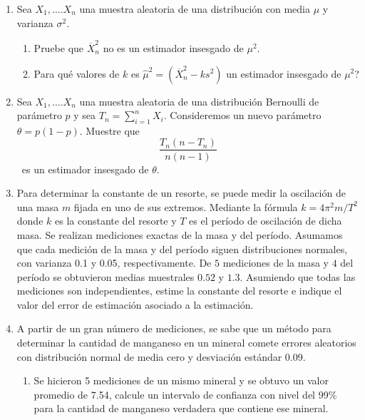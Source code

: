 \documentclass[11pt,a4paper,twoside]{article}%
\begin{document}
\begin{enumerate}
\item Sea $X_{1},\ldots.X_{n}$ una muestra aleatoria de una distribuci\'{o}n
con media $\mu$ y varianza $\sigma^{2}$.

\begin{enumerate}
\item Pruebe que $\overline{X}_{n}^{2}$ no es un estimador insesgado de
$\mu^{2}$.

\item \textquestiondown Para qu\'{e} valores de $k$ es $\widehat{\mu}%
^{2}=\left(  \overline{X}_{n}^{2}-ks^{2}\right)  $ un estimador insesgado de
$\mu^{2}$?
\end{enumerate}

\item Sea $X_{1},\ldots.X_{n}$ una muestra aleatoria de una distribuci\'{o}n
Bernoulli de par\'{a}metro $p$ y sea $T_{n}=%
{\displaystyle\sum\limits_{i=1}^{n}}
X_{i}$. Consideremos un nuevo par\'{a}metro $\theta=p\left(  1-p\right)  $.
Muestre que
\[
\frac{T_{n}\left(  n-T_{n}\right)  }{n\left(  n-1\right)  }%
\]
\ es un estimador insesgado de $\theta$.

\item Para determinar la constante de un resorte, se puede medir la oscilaci\'on de una masa $m$ fijada en uno de sus extremos. Mediante
la f\'ormula $k= 4\pi^2m/T^2$ donde $k$ es la constante del resorte y $T$ es el per\'iodo de oscilaci\'on de dicha masa. 
 Se realizan mediciones exactas de la masa y del per\'iodo. Asumamos que 
cada medici\'on de la masa y del per\'iodo siguen distribuciones  normales, con varianza 0.1 y 0.05, respectivamente. 
De $5$ mediciones de la masa y $4$ del per\'iodo se obtuvieron medias muestrales $0.52$ y $1.3$. 
Asumiendo que todas las mediciones son independientes,
estime la constante del resorte e indique el valor del error de estimaci\'on asociado a la estimaci\'on. 



\item A partir de un gran n\'{u}mero de mediciones, se sabe que un m\'{e}todo
para determinar la cantidad de manganeso en un mineral comete errores
aleatorios con distribuci\'{o}n normal de media cero y desviaci\'{o}n
est\'{a}ndar 0.09.

\begin{enumerate}
	\item Se hicieron 5 mediciones de un mismo mineral y se obtuvo un valor
	promedio de 7.54, calcule un intervalo de confianza con nivel del 99\% para la
	cantidad de manganeso verdadera que contiene ese mineral.
	

\end{enumerate}
\end{enumerate}
\end{document}
